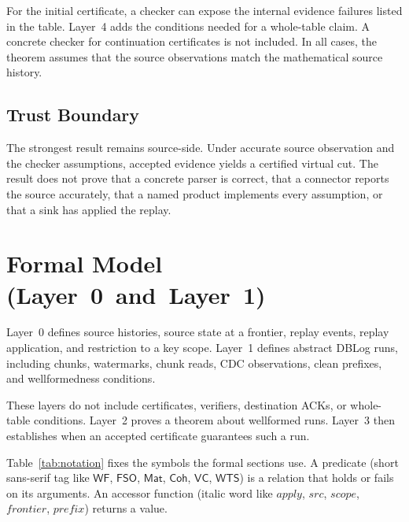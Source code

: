 \documentclass[letterpaper,10pt,twocolumn]{article}
\newcommand{\Apply}{\mathit{apply}}
\newcommand{\Src}{\mathit{src}}
\newcommand{\Scope}{\mathit{scope}}
\newcommand{\Frontier}{\mathit{frontier}}
\newcommand{\CleanPrefix}{\mathit{prefix}}
\newcommand{\WF}{\mathsf{WF}}
\newcommand{\FSO}{\mathsf{FSO}}
\newcommand{\Mat}{\mathsf{Mat}}
\newcommand{\Coh}{\mathsf{Coh}}
\newcommand{\VC}{\mathsf{VC}}
\newcommand{\WTS}{\mathsf{WTS}}
\begin{document}
For the initial certificate, a checker can expose the internal evidence
failures listed in the table. Layer~4 adds the conditions needed for a
whole-table claim. A concrete checker for continuation certificates is
not included. In all cases, the theorem assumes that the source
observations match the mathematical source history.

\subsection{Trust Boundary}\label{sec:trust-boundary}

The strongest result remains source-side. Under accurate source
observation and the checker assumptions, accepted evidence yields a
certified virtual cut. The result does not prove that a concrete parser
is correct, that a connector reports the source accurately, that a
named product implements every assumption, or that a sink has applied
the replay.

\section{Formal Model \mbox{(Layer 0 and Layer 1)}}\label{formal-model-layer-0-and-layer-1}

Layer~0 defines source histories, source state at a frontier, replay
events, replay application, and restriction to a key scope. Layer~1
defines abstract DBLog runs, including chunks, watermarks, chunk reads,
CDC observations, clean prefixes, and wellformedness conditions.

These layers do not include certificates, verifiers, destination ACKs,
or whole-table conditions. Layer~2 proves a theorem about wellformed
runs. Layer~3 then establishes when an accepted certificate guarantees
such a run.

Table~\ref{tab:notation} fixes the symbols the formal sections use. A
predicate (short sans-serif tag like $\WF$, $\FSO$, $\Mat$, $\Coh$,
$\VC$, $\WTS$) is a relation that holds or fails on its arguments. An
accessor function (italic word like $\Apply$, $\Src$, $\Scope$,
$\Frontier$, $\CleanPrefix$) returns a value.
\end{document}
